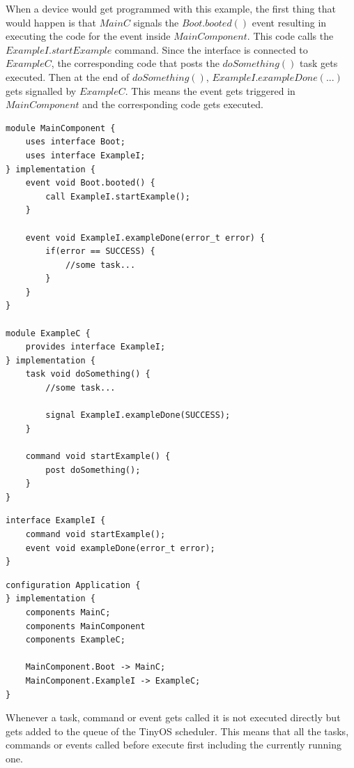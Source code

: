 When a device would get programmed with this example, the first thing that would happen is that $MainC$ signals the $Boot.booted()$ event resulting in executing the code for the event inside $MainComponent$. This code calls the $ExampleI.startExample$ command. Since the interface is connected to $ExampleC$, the corresponding code that posts the $doSomething()$ task gets executed. Then at the end of $doSomething()$, $ExampleI.exampleDone(...)$ gets signalled by $ExampleC$. This means the event gets triggered in $MainComponent$ and the corresponding code gets executed. \cite{Tinyos} \cite{TinyosT}     

\begin{lstlisting}
module MainComponent {
	uses interface Boot;
	uses interface ExampleI;
} implementation {
	event void Boot.booted() {
		call ExampleI.startExample();
	}
	
	event void ExampleI.exampleDone(error_t error) {
		if(error == SUCCESS) {
			//some task...
		}
	}
}

module ExampleC {
	provides interface ExampleI;
} implementation {
	task void doSomething() {
		//some task...
		
		signal ExampleI.exampleDone(SUCCESS);
	}
	
	command void startExample() {
		post doSomething();
	}
}
\end{lstlisting}


\begin{lstlisting}
interface ExampleI {
	command void startExample();
	event void exampleDone(error_t error);
}
\end{lstlisting}

\begin{lstlisting}
configuration Application {
} implementation {
	components MainC;
	components MainComponent
	components ExampleC;
		
	MainComponent.Boot -> MainC;
	MainComponent.ExampleI -> ExampleC;
}
\end{lstlisting} 

Whenever a task, command or event gets called it is not executed directly but gets added to the queue of the TinyOS scheduler. This means that all the tasks, commands or events called before execute first including the currently running one. 